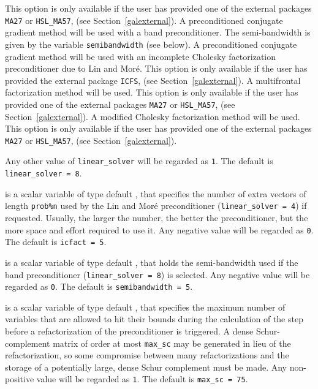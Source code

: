 \documentclass{galahad}
\begin{document}
\begin{description}
\begin{description}
    This option is only available if the user has provided one of the
    external packages {\tt MA27} or {\tt HSL\_MA57},
    (see Section~\ref{galexternal}).
    A preconditioned conjugate gradient
    method will be used with a band
    preconditioner. The semi-bandwidth
    is given by the variable {\tt semibandwidth} (see below).
    A preconditioned conjugate gradient
    method will be used with an incomplete Cholesky factorization
    preconditioner due to Lin and Mor\'{e}.
    This option is only
    available if the user has provided the external package {\tt ICFS},
    (see Section~\ref{galexternal}).
    A multifrontal factorization method will be used.
    This option is only available if the user has provided one of the
    external packages {\tt MA27} or {\tt HSL\_MA57},
    (see Section~\ref{galexternal}).
    A modified Cholesky factorization method will be used.
    This option is only available if the user has provided one of the
    external packages {\tt MA27} or {\tt HSL\_MA57},
    (see Section~\ref{galexternal}).
\end{description}
Any other value of {\tt linear\_solver} will be regarded as {\tt 1}.
The default is {\tt linear\_solver = 8}.

 is a scalar variable of type default \integer, that specifies
the number of extra vectors of length {\tt prob\%n} used by the Lin and
Mor\'{e} preconditioner ({\tt linear\_solver = 4}) if requested.
Usually, the larger the number, the
better the preconditioner, but the more space and effort required to
use it. Any negative value will be regarded as {\tt 0}.
The default is {\tt icfact = 5}.

 is a scalar variable of type default \integer, that holds
the semi-bandwidth used if the band preconditioner ({\tt linear\_solver = 8})
is selected. Any negative value will be regarded as {\tt 0}.
The default is {\tt semibandwidth = 5}.

 is a scalar variable of type default \integer, that specifies
the maximum number of variables that are allowed to hit their bounds
during the calculation of the step before a refactorization of the
preconditioner is triggered. A dense Schur-complement matrix of order
at most {\tt max\_sc} may be generated in lieu of the refactorization, so
some compromise between many refactorizations and the storage of a potentially
large, dense Schur complement must be made.
Any non-positive value will be regarded as {\tt 1}.
The default is {\tt max\_sc = 75}.


\end{description}
\end{document}
